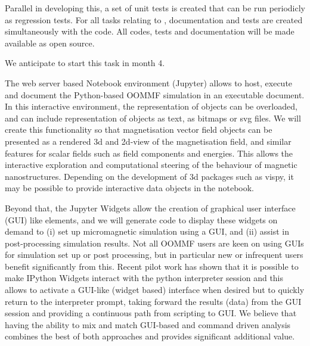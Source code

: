 \begin{workpackage}
\begin{tasklist}
\begin{task}[id=oommf-python-interface,title=OOMMF case study: Create Python interface to OOMMF code]
  Parallel in developing this, a set of unit tests is created that can
  be run periodicly as regression tests. For all tasks relating to
  \OOMMFNB, documentation and tests are created simultaneously with
  the code. All codes, tests and documentation will be made available as open source.

  We anticipate to start this task 
  in month 4.
\end{task}

\begin{task}[title=OOMMF case study: Extend \texttt{OOMMF-py} with IPython
    notebook attributes and GUI templates]

  The web server based Notebook environment (Jupyter) allows to host,
  execute and document the Python-based OOMMF simulation in an
  executable document. In this interactive environment, the
  representation of objects can be overloaded, and can include
  representation of objects as text, as bitmaps or svg files. We will
  create this functionality so that magnetisation vector field objects
  can be presented as a rendered 3d and 2d-view of the magnetisation
  field, and similar features for scalar fields such as field
  components and energies. This allows the interactive exploration and
  computational steering of the behaviour of magnetic
  nanostructures. Depending on the development of 3d packages such as
  vispy, it may be possible to provide interactive data objects in the
  notebook.

  Beyond that, the Jupyter Widgets allow the creation of graphical
  user interface (GUI) like elements, and we will generate code to
  display these widgets on demand to (i) set up micromagnetic
  simulation using a GUI, and (ii) assist in post-processing
  simulation results. Not all OOMMF users are keen on using GUIs for
  simulation set up or post processing, but in particular new or
  infrequent users benefit significantly from this. Recent pilot work
  has shown that it is possible to make IPython Widgets interact with
  the python interpreter session and this allows to activate a
  GUI-like (widget based) interface when desired but to quickly return
  to the interpreter prompt, taking forward the results (data) from
  the GUI session \cite{IPython-widget-GUI-demo-youtube-2014} and
  providing a continuous path from scripting to GUI. We
  believe that having the ability to mix and match GUI-based and
  command driven analysis combines the best of both approaches and
  provides significant additional value.
\end{task}


\end{tasklist}
\end{workpackage}
